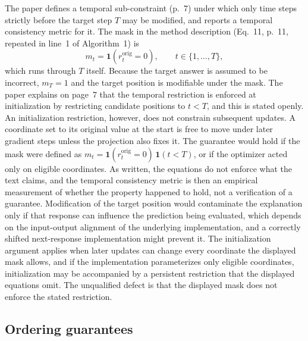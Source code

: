 \documentclass[11pt]{article}
\newcommand{\Ind}{\mathbf{1}}
\begin{document}
The paper defines a temporal sub-constraint (p.~7) under which only time steps strictly before the target step $T$ may be modified, and reports a temporal consistency metric for it. The mask in the method description (Eq.~11, p.~11, repeated in line~1 of Algorithm~1) is
\[
m_t=\Ind\!\left(r_t^{\mathrm{orig}}=0\right),\qquad t\in\{1,\dots,T\},
\]
which runs through $T$ itself. Because the target answer is assumed to be incorrect, $m_T=1$ and the target position is modifiable under the mask. The paper explains on page~7 that the temporal restriction is enforced at initialization by restricting candidate positions to $t<T$, and this is stated openly. An initialization restriction, however, does not constrain subsequent updates. A coordinate set to its original value at the start is free to move under later gradient steps unless the projection also fixes it. The guarantee would hold if the mask were defined as $m_t=\Ind(r_t^{\mathrm{orig}}=0)\,\Ind(t<T)$, or if the optimizer acted only on eligible coordinates. As written, the equations do not enforce what the text claims, and the temporal consistency metric is then an empirical measurement of whether the property happened to hold, not a verification of a guarantee. Modification of the target position would contaminate the explanation only if that response can influence the prediction being evaluated, which depends on the input-output alignment of the underlying implementation, and a correctly shifted next-response implementation might prevent it. The initialization argument applies when later updates can change every coordinate the displayed mask allows, and if the implementation parameterizes only eligible coordinates, initialization may be accompanied by a persistent restriction that the displayed equations omit. The unqualified defect is that the displayed mask does not enforce the stated restriction.

\subsection{Ordering guarantees}
\end{document}
